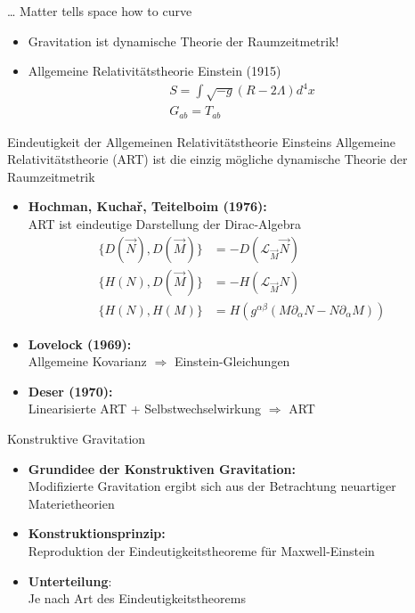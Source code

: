 \documentclass{beamer}
\begin{document}
    \begin{frame}{\ldots{} Matter tells space how to curve}
        \begin{itemize}
            \item Gravitation ist dynamische Theorie der Raumzeitmetrik!
            \item Allgemeine Relativitätstheorie {\scriptsize\lbrack Einstein (1915)\rbrack}
            \begin{gather*}
                S = \int \sqrt{-g} (R - 2 \Lambda) d^4 x \\
                G_{ab} = T_{ab}
            \end{gather*}
        \end{itemize}
    \end{frame}

    \begin{frame}{Eindeutigkeit der Allgemeinen Relativitätstheorie}
        Einsteins Allgemeine Relativitätstheorie (ART) ist die einzig mögliche dynamische Theorie
        der Raumzeitmetrik \pause
        \begin{itemize}
            \setlength{\belowdisplayskip}{-10pt}
            \item \textbf{Hochman, Kuchař, Teitelboim (1976):} \\ ART ist eindeutige Darstellung der Dirac-Algebra
            \begin{align*}
                \{ D(\vec N), D(\vec M) \} &= -D(\mathcal L_{\vec M} \vec N) \\
                \{ H(N), D(\vec M) \} &= -H(\mathcal L_{\vec M} N) \\
                \{ H(N), H(M) \} &= H(g^{\alpha\beta}(M\partial_\alpha N - N\partial_\alpha M))
            \end{align*} \pause
            \item \textbf{Lovelock (1969):} \\ Allgemeine Kovarianz $\Rightarrow$ Einstein-Gleichungen \pause
            \item \textbf{Deser (1970):} \\ Linearisierte ART + Selbstwechselwirkung $\Rightarrow$ ART
        \end{itemize}
    \end{frame}

    \begin{frame}{Konstruktive Gravitation}
        \begin{itemize}
            \item \textbf{Grundidee der Konstruktiven Gravitation:} \\
            Modifizierte Gravitation ergibt sich aus der Betrachtung neuartiger Materietheorien
            \item \textbf{Konstruktionsprinzip:} \\
            Reproduktion der Eindeutigkeitstheoreme für Maxwell-Einstein
            \item \textbf{Unterteilung}: \\
            Je nach Art des Eindeutigkeitstheorems
        \end{itemize}
    \end{frame}
\end{document}
